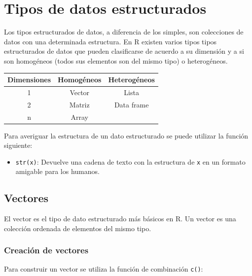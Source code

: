\documentclass[
]{book}
\providecommand{\tightlist}{%
  \setlength{\itemsep}{0pt}\setlength{\parskip}{0pt}}
\theoremstyle{definition}
\theoremstyle{definition}
\theoremstyle{definition}
\theoremstyle{definition}
\theoremstyle{remark}
\begin{document}
\hypertarget{section}{%
\section{}\label{section}}

\hypertarget{tipos-de-datos-estructurados}{%
\chapter{Tipos de datos estructurados}\label{tipos-de-datos-estructurados}}

Los tipos estructurados de datos, a diferencia de los simples, son colecciones de datos con una determinada estructura. En R existen varios tipos tipos estructurados de datos que pueden clasificarse de acuerdo a su dimensión y a si son homogéneos (todos sus elementos son del mismo tipo) o heterogéneos.

\begin{longtable}[]{@{}ccc@{}}
\toprule
Dimensiones & Homogéneos & Heterogéneos \\
\midrule
\endhead
1 & Vector & Lista \\
2 & Matriz & Data frame \\
n & Array & \\
\bottomrule
\end{longtable}

Para averiguar la estructura de un dato estructurado se puede utilizar la función siguiente:

\begin{itemize}
\tightlist
\item
  \texttt{str(x)}: Devuelve una cadena de texto con la estructura de \texttt{x} en un formato amigable para los humanos.
\end{itemize}

\hypertarget{vectores}{%
\section{Vectores}\label{vectores}}

El vector es el tipo de dato estructurado más básicos en R. Un vector es una colección ordenada de elementos del mismo tipo.

\hypertarget{creaciuxf3n-de-vectores}{%
\subsection{Creación de vectores}\label{creaciuxf3n-de-vectores}}

Para construir un vector se utiliza la función de combinación \texttt{c()}:
\end{document}
